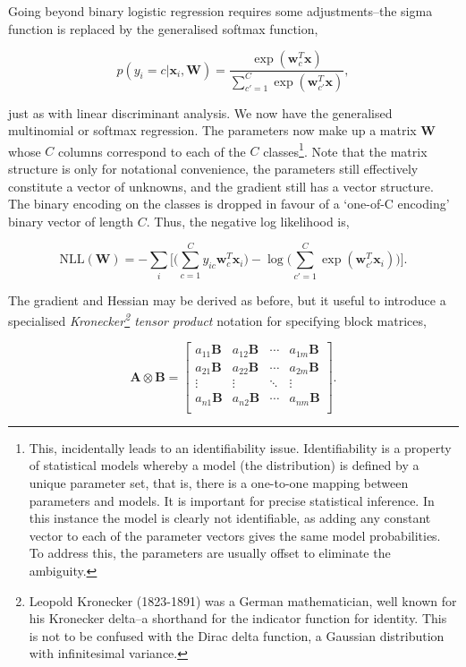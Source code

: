 \documentclass[11pt]{amsart}
\begin{document}
Going beyond binary logistic regression requires some adjustments--the sigma function is replaced by the generalised softmax function,

$$p(y_i = c | \mathbf{x}_i, \mathbf{W}) = \frac{\exp(\mathbf{w}_c^T\mathbf{x})}{\sum_{c' = 1}^C \exp(\mathbf{w}_{c'}^T\mathbf{x})},$$

just as with linear discriminant analysis. We now have the generalised multinomial or softmax regression. The parameters now make up a matrix $\mathbf{W}$ whose $C$ columns correspond to each of the $C$ classes\footnote{This, incidentally leads to an identifiability issue. Identifiability is a property of statistical models whereby a model (the distribution) is defined by a unique parameter set, that is, there is a one-to-one mapping between parameters and models. It is important for precise statistical inference. In this instance the model is clearly not identifiable, as adding any constant vector to each of the parameter vectors gives the same model probabilities. To address this, the parameters are usually offset to eliminate the ambiguity.}. Note that the matrix structure is only for notational convenience, the parameters still effectively constitute a vector of unknowns, and the gradient still has a vector structure. The binary encoding on the classes is dropped in favour of a `one-of-C encoding' binary vector of length $C$. Thus, the negative log likelihood is,

$$\text{NLL}(\mathbf{W}) = -\sum_i \bigg[\bigg(\sum_{c = 1}^Cy_{ic}\mathbf{w}_c^T\mathbf{x}_i\bigg) - \log\bigg(\sum_{c'=1}^C\exp(\mathbf{w}_{c'}^T\mathbf{x}_i)\bigg)\bigg].$$

The gradient and Hessian may be derived as before, but it useful to introduce a specialised \emph{Kronecker\footnote{Leopold Kronecker (1823-1891) was a German mathematician, well known for his Kronecker delta--a shorthand for the indicator function for identity. This is not to be confused with the Dirac delta function, a Gaussian distribution with infinitesimal variance.} tensor product} notation for specifying block matrices,

$$\mathbf{A} \otimes \mathbf{B} = \begin{bmatrix}
a_{11}\mathbf{B}&a_{12}\mathbf{B}&\cdots&a_{1m}\mathbf{B}\\
a_{21}\mathbf{B}&a_{22}\mathbf{B}&\cdots&a_{2m}\mathbf{B}\\
\vdots & \vdots & \ddots & \vdots \\
a_{n1}\mathbf{B}&a_{n2}\mathbf{B}&\cdots&a_{nm}\mathbf{B}\\
\end{bmatrix}.$$
\end{document}
